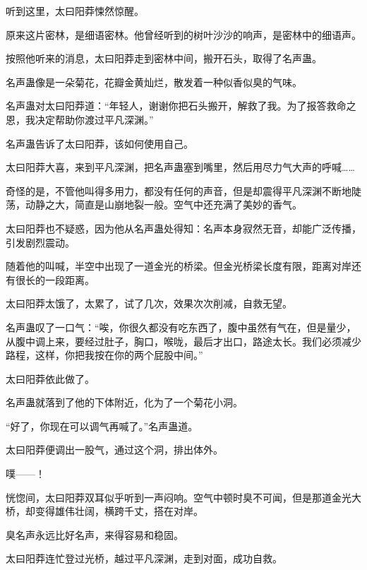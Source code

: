 \begin{this_body}
听到这里，太曰阳莽悚然惊醒。

原来这片密林，是细语密林。他曾经听到的树叶沙沙的响声，是密林中的细语声。

按照他听来的消息，太曰阳莽走到密林中间，搬开石头，取得了名声蛊。

名声蛊像是一朵菊花，花瓣金黄灿烂，散发着一种似香似臭的气味。

名声蛊对太曰阳莽道：“年轻人，谢谢你把石头搬开，解救了我。为了报答救命之恩，我决定帮助你渡过平凡深渊。”

名声蛊告诉了太曰阳莽，该如何使用自己。

太曰阳莽大喜，来到平凡深渊，把名声蛊塞到嘴里，然后用尽力气大声的呼喊……

奇怪的是，不管他叫得多用力，都没有任何的声音，但是却震得平凡深渊不断地陡荡，动静之大，简直是山崩地裂一般。空气中还充满了美妙的香气。

太曰阳莽也不疑惑，因为他从名声蛊处得知：名声本身寂然无音，却能广泛传播，引发剧烈震动。

随着他的叫喊，半空中出现了一道金光的桥梁。但金光桥梁长度有限，距离对岸还有很长的一段距离。

太曰阳莽太饿了，太累了，试了几次，效果次次削减，自救无望。

名声蛊叹了一口气：“唉，你很久都没有吃东西了，腹中虽然有气在，但是量少，从腹中调上来，要经过肚子，胸口，喉咙，最后才出口，路途太长。我们必须减少路程，这样，你把我按在你的两个屁股中间。”

太曰阳莽依此做了。

名声蛊就落到了他的下体附近，化为了一个菊花小洞。

“好了，你现在可以调气再喊了。”名声蛊道。

太曰阳莽便调出一股气，通过这个洞，排出体外。

噗——！

恍惚间，太曰阳莽双耳似乎听到一声闷响。空气中顿时臭不可闻，但是那道金光大桥，却变得雄伟壮阔，横跨千丈，搭在对岸。

臭名声永远比好名声，来得容易和稳固。

太曰阳莽连忙登过光桥，越过平凡深渊，走到对面，成功自救。

\end{this_body}

